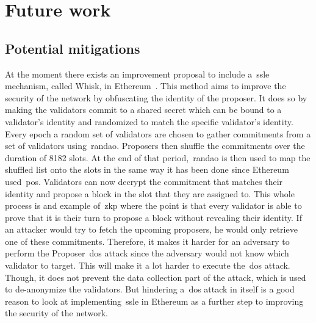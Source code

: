 

\section{Future work}\label{sec:future-works}

\subsection{Potential mitigations}\label{subsec:potential-mitigations}
At the moment there exists an improvement proposal
to include a~\gls{ssle} mechanism, called Whisk, in Ethereum~\cite{EthereumResearchSSLE2024}.
This method aims to improve the security of the network by obfuscating the identity of the proposer.
It does so by making the validators commit to a shared secret which can be bound to a validator's identity and randomized to match the specific validator's identity.
Every epoch a random set of validators are chosen to gather commitments from a set of validators using~\gls{randao}.
Proposers then shuffle the commitments over the duration of 8182 slots.
At the end of that period,~\gls{randao} is then used to map the shuffled list onto the slots in the same way it has been done since Ethereum used~\gls{pos}.
Validators can now decrypt the commitment that matches their identity and propose a block in the slot that they are assigned to.
This whole process is and example of~\gls{zkp} where the point is that every validator is able to prove that it is their turn to propose a block without revealing their identity.
If an attacker would try to fetch the upcoming proposers, he would only retrieve one of these commitments.
Therefore, it makes it harder
for an adversary to perform the Proposer~\gls{dos} attack since the adversary would not know which validator to target.
This will make it a lot harder to execute the~\gls{dos} attack.
Though, it does not prevent the data collection part of the attack, which is used to de-anonymize the validators.
But hindering a~\gls{dos} attack in itself is a good reason
to look at implementing~\gls{ssle} in Ethereum as a further step to improving the security of the network.
